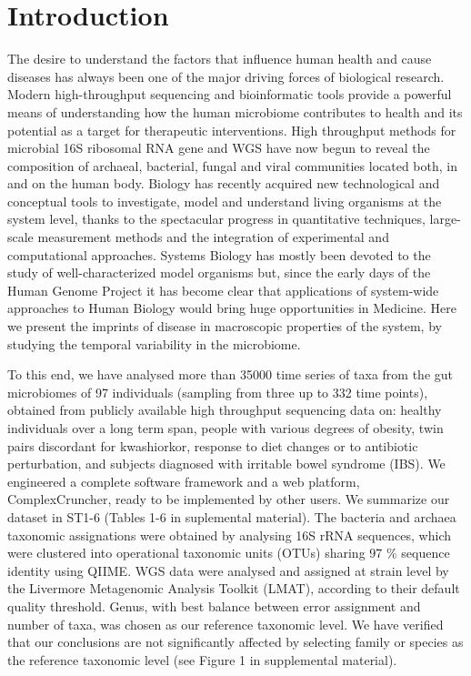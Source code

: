 \documentclass[12pt]{article}
\begin{document}
\section*{Introduction}


The desire to understand the factors that influence human health and cause diseases has always been one of the major driving forces of biological research. Modern high-throughput sequencing and bioinformatic tools provide a powerful means of understanding how the human microbiome contributes to health and its potential as a target for therapeutic interventions. High throughput methods for microbial 16S ribosomal RNA gene and WGS have now begun to reveal the composition of archaeal, bacterial, fungal and viral communities located both, in and on the human body. Biology has recently acquired new technological and conceptual tools to investigate, model and understand living organisms at the system level, thanks to the spectacular progress in quantitative techniques, large-scale measurement methods and the integration of experimental and computational approaches. Systems Biology has mostly been devoted to the study of well-characterized model organisms but, since the early days of the Human Genome Project it has become clear that applications of system-wide approaches to Human Biology would bring huge opportunities in Medicine. Here we present the imprints of disease in macroscopic properties of the system, by studying the temporal variability in the microbiome.

To this end, we have analysed more than 35000 time series of taxa from the gut microbiomes of 97 individuals (sampling from three up to 332 time points), obtained from publicly available high throughput sequencing data on: healthy individuals over a long term span\cite{moving}, people with various degrees of obesity\cite{lea}, twin pairs discordant for kwashiorkor\cite{kwashiorkor}, response to diet changes\cite{diet} or to antibiotic perturbation\cite{antibiotic}, and subjects diagnosed with irritable bowel syndrome (IBS)\cite{durban}. 
We engineered a complete software framework and a web platform, ComplexCruncher, ready to be implemented by other users.  
We summarize our dataset in ST1-6 (Tables 1-6 in suplemental material). The bacteria and archaea taxonomic assignations were obtained by analysing 16S rRNA sequences, which were clustered into operational taxonomic units (OTUs) sharing 97 \% sequence identity using QIIME\cite{qiime}. WGS data\cite{kwashiorkor} were analysed and assigned at strain level by the Livermore Metagenomic Analysis Toolkit (LMAT)\cite{lmat}, according to their default quality threshold. Genus, with best balance between error assignment and number of taxa, was chosen as our reference taxonomic level. We have verified that our conclusions are not significantly affected by selecting family or species as the reference taxonomic level (see Figure 1 in supplemental material).
\end{document}
